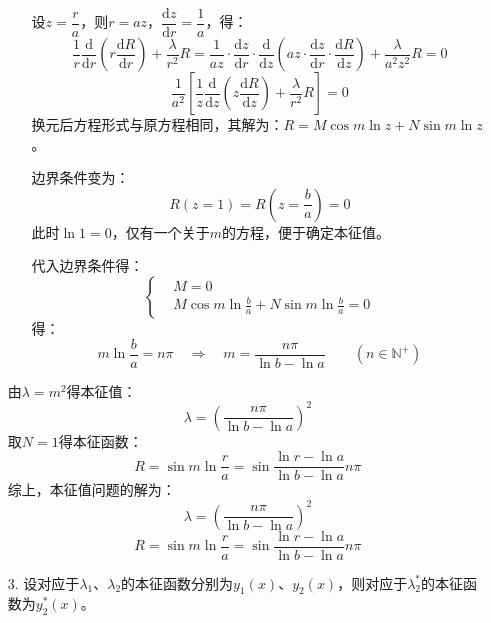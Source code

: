 \documentclass[a4paper,fontset=windows]{ctexart}
\begin{document}
\begin{itemize}
\begin{itemize}
设$z = \dfrac{r}{a}$，则$r = az$，$\dfrac{\mathrm{d}z}{\mathrm{d}r} = \dfrac{1}{a}$，得：
\[
\frac{1}{r}\frac{\mathrm{d}}{\mathrm{d}r}\left(r\frac{\mathrm{d}R}{\mathrm{d}r}\right) + \frac{\lambda}{r^2}R = \frac{1}{az}\cdot\frac{\mathrm{d}z}{\mathrm{d}r}\cdot\frac{\mathrm{d}}{\mathrm{d}z}\left(az\cdot\frac{\mathrm{d}z}{\mathrm{d}r}\cdot\frac{\mathrm{d}R}{\mathrm{d}z}\right) + \frac{\lambda}{a^2 z^2}R = 0
\]
\[
\frac{1}{a^2}\left[\frac{1}{z}\frac{\mathrm{d}}{\mathrm{d}z}\left(z\frac{\mathrm{d}R}{\mathrm{d}z}\right) + \frac{\lambda}{r^2}R\right] = 0
\]
换元后方程形式与原方程相同，其解为：$R = M\cos{m\ln z} + N\sin{m\ln z}$。

边界条件变为：
\[
R(z = 1) = R(z = \dfrac{b}{a}) = 0
\]
此时$\ln1 = 0$，仅有一个关于$m$的方程，便于确定本征值。

代入边界条件得：
\[
\left\{
\begin{aligned}
&M = 0 \\
&M\cos{m\ln\frac{b}{a}} + N\sin{m\ln\frac{b}{a}} = 0
\end{aligned}
\right.
\]
得：
\[
m\ln\frac{b}{a} = n\pi \quad\Rightarrow\quad m = \frac{n\pi}{\ln b - \ln a}\qquad (n\in\mathbb{N}^+)
\]
\end{itemize}

由$\lambda = m^2$得本征值：
\[
\lambda = \left(\frac{n\pi}{\ln b - \ln a}\right)^2
\]
取$N = 1$得本征函数：
\[
R = \sin{m\ln\frac{r}{a}} = \sin{\frac{\ln r - \ln a}{\ln b - \ln a}n\pi}
\]
综上，本征值问题的解为：
\[
\lambda = \left(\frac{n\pi}{\ln b - \ln a}\right)^2
\]
\[
R = \sin{m\ln\frac{r}{a}} = \sin{\frac{\ln r - \ln a}{\ln b - \ln a}n\pi}
\]
\bigskip

\item[3.]
设对应于$\lambda_1$、$\lambda_2$的本征函数分别为$y_1(x)$、$y_2(x)$，则对应于$\lambda_2^*$的本征函数为$y_2^*(x)$。


\end{itemize}
\end{document}
